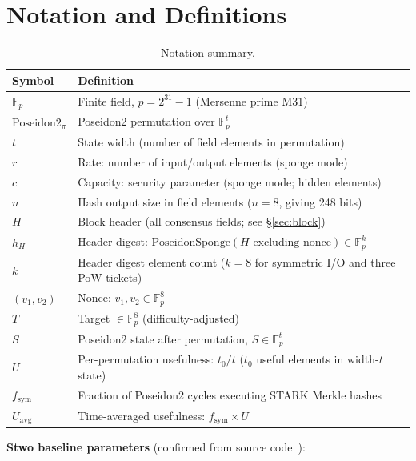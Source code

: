 \documentclass[11pt,a4paper]{article}
\begin{document}
\section{Notation and Definitions}
\label{sec:notation}

\begin{table}[h]
\centering
\begin{tabular}{@{}ll@{}}
\toprule
Symbol & Definition \\
\midrule
$\mathbb{F}_p$ & Finite field, $p = 2^{31}-1$ (Mersenne prime M31) \\
$\mathrm{Poseidon2}_\pi$ & Poseidon2 permutation over $\mathbb{F}_p^t$ \\
$t$ & State width (number of field elements in permutation) \\
$r$ & Rate: number of input/output elements (sponge mode) \\
$c$ & Capacity: security parameter (sponge mode; hidden elements) \\
$n$ & Hash output size in field elements ($n = 8$, giving 248 bits) \\
$H$ & Block header (all consensus fields; see \S\ref{sec:block}) \\
$h_H$ & Header digest: $\mathrm{PoseidonSponge}(H \text{ excluding nonce}) \in \mathbb{F}_p^k$ \\
$k$ & Header digest element count ($k = 8$ for symmetric I/O and three PoW tickets) \\
$(v_1, v_2)$ & Nonce: $v_1, v_2 \in \mathbb{F}_p^8$ \\
$T$ & Target $\in \mathbb{F}_p^8$ (difficulty-adjusted) \\
$S$ & Poseidon2 state after permutation, $S \in \mathbb{F}_p^t$ \\
$U$ & Per-permutation usefulness: $t_0/t$ ($t_0$ useful elements in width-$t$ state) \\
$f_{\mathrm{sym}}$ & Fraction of Poseidon2 cycles executing STARK Merkle hashes \\
$U_{\mathrm{avg}}$ & Time-averaged usefulness: $f_{\mathrm{sym}} \times U$ \\
\bottomrule
\end{tabular}
\caption{Notation summary.}
\label{tab:notation}
\end{table}

\textbf{Stwo baseline parameters} (confirmed from source code~\cite{stwo}):
\end{document}
